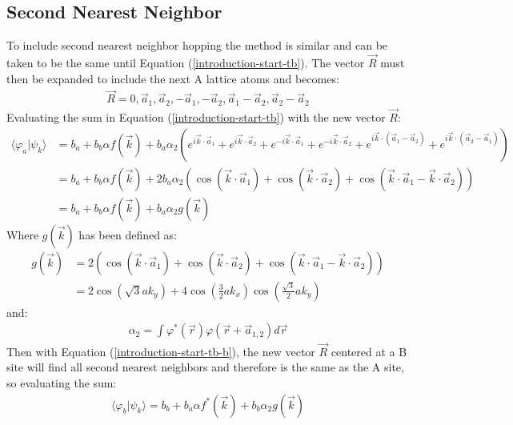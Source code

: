 		\subsection{Second Nearest Neighbor}
		\label{Introduction - Second Nearest Neighbor}
			To include second nearest neighbor hopping the method is similar and can be taken to be the same until Equation (\ref{introduction-start-tb}). The vector $\vec{R}$ must then be expanded to include the next A lattice atoms and becomes:
			\begin{align}
				\vec{R}=0, \vec{a}_{1}, \vec{a}_{2}, -\vec{a}_{1}, -\vec{a}_{2}, \vec{a}_{1}-\vec{a}_{2}, \vec{a}_{2}-\vec{a}_{2}
			\end{align}
			Evaluating the sum in Equation (\ref{introduction-start-tb}) with the new vector $\vec{R}$:
			\begin{align}
				\langle\varphi_{a}|\psi_{k}\rangle&=b_{a}+b_{b}\alpha f\left(\vec{k}\right)+b_{a}\alpha_{2}\left(e^{i\vec{k}\cdot\vec{a}_{1}}+e^{i\vec{k}\cdot\vec{a}_{2}}+e^{-i\vec{k}\cdot\vec{a}_{1}}+e^{-i\vec{k}\cdot\vec{a}_{2}}+e^{i\vec{k}\cdot\left(\vec{a}_{1}-\vec{a}_{2}\right)}+e^{i\vec{k}\cdot\left(\vec{a}_{2}-\vec{a}_{1}\right)}\right)\\
				&=b_{a}+b_{b}\alpha f\left(\vec{k}\right)+2b_{a}\alpha_{2}\left(\cos\left(\vec{k}\cdot \vec{a}_{1}\right)+\cos\left(\vec{k}\cdot \vec{a}_{2}\right)+\cos\left(\vec{k}\cdot \vec{a}_{1}-\vec{k}\cdot \vec{a}_{2}\right)\right)\\
				&=b_{a}+b_{b}\alpha f\left(\vec{k}\right)+b_{a}\alpha_{2}g\left(\vec{k}\right)
			\end{align}
			Where $g\left(\vec{k}\right)$ has been defined as:
			\begin{align}
				g\left(\vec{k}\right)&=2\left(\cos\left(\vec{k}\cdot \vec{a}_{1}\right)+\cos\left(\vec{k}\cdot \vec{a}_{2}\right)+\cos\left(\vec{k}\cdot \vec{a}_{1}-\vec{k}\cdot \vec{a}_{2}\right)\right)\\
				&=2\cos\left(\sqrt{3}ak_{y}\right)+4\cos\left(\frac{3}{2}ak_{x}\right)\cos\left(\frac{\sqrt{3}}{2}ak_{y}\right)
			\end{align}
			and:
			\begin{align}
				\alpha_{2}=\int\varphi^{*}\left(\vec{r}\right)\varphi\left(\vec{r}+\vec{a}_{1,2}\right)d\vec{r}
			\end{align}
			Then with Equation (\ref{introduction-start-tb-b}), the new vector $\vec{R}$ centered at a B site will find all second nearest neighbors and therefore is the same as the A site, so evaluating the sum:
			\begin{align}
				\langle\varphi_{b}|\psi_{k}\rangle=b_{b}+b_{a}\alpha f^{*}\left(\vec{k}\right)+b_{b}\alpha_{2}g\left(\vec{k}\right)
			\end{align}
